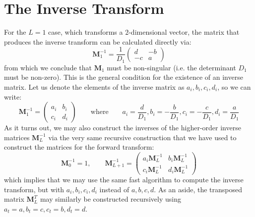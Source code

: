 \section{The Inverse Transform}
For the $L = 1$ case, which transforms a $2$-dimensional vector, the matrix that produces the inverse transform can be calculated directly via:
\begin{equation}
 \mathbf{M}_1^{-1} =
 \frac{1}{D_1}
 \begin{pmatrix}
 d  & -b  \\
 -c &  a
 \end{pmatrix} 
\end{equation}
from which we conclude that $\mathbf{M}_1$ must be non-singular (i.e. the determinant $D_1$ must be non-zero). This is the general condition for the existence of an inverse matrix. Let us denote the elements of the inverse matrix as $a_i, b_i, c_i, d_i$, so we can write:
\begin{equation}
 \mathbf{M}_1^{-1} =
 \begin{pmatrix}
 a_i & b_i  \\
 c_i & d_i
 \end{pmatrix} 
 \qquad \text{where} \qquad
 a_i = \frac{d}{D_1}, b_i = -\frac{b}{D_1}, c_i = -\frac{c}{D_1}, d_i = \frac{a}{D_1}
\end{equation}
As it turns out, we may also construct the inverses of the higher-order inverse matrices $\mathbf{M}_L^{-1}$ via the very same recursive construction that we have used to construct the matrices for the forward transform:
\begin{equation}
 \mathbf{M}_0^{-1} = 1, \qquad
 \mathbf{M}_{L+1}^{-1} =
 \begin{pmatrix}
 a_i \mathbf{M}_L^{-1} &  b_i \mathbf{M}_L^{-1}  \\
 c_i \mathbf{M}_L^{-1} &  d_i \mathbf{M}_L^{-1}
 \end{pmatrix}
\end{equation}
which implies that we may use the same fast algorithm to compute the inverse transform, but with $a_i, b_i, c_i, d_i$ instead of $a, b ,c, d$. As an aside, the transposed matrix $\mathbf{M}_L^T$ may similarly be constructed recursively using $a_t = a, b_t = c, c_t = b, d_t = d$. 







